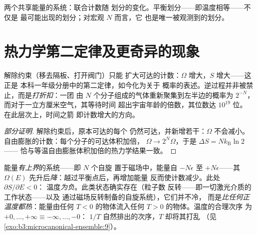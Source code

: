 \begin{omfigure}

{\small 两个共享能量的系统：联合计数随
划分的变化。平衡划分——即温度相等——不仅是
最可能出现的划分；对宏观 $N$ 而言，它
也是唯一被观测到的划分。}
\end{omfigure}

\section{热力学第二定律及更奇异的现象}

\begin{proposition}[不可逆性即计数]\label{prop:b3:microcanonical-ensemble:second-law}
解除约束（移去隔板、打开阀门）只能
扩大可达的计数：$\Omega$ 增大，$S$ 增大——这正是
本科一年级分册中的第二定律，如今化为关于
概率的表述。逆过程并非被禁止，而是\emph{打折扣}：一团
由 $N$ 个分子组成的气体重新聚集到左半边的概率为
$2^{-N}$，而对于一立方厘米空气，其等待时间
超出宇宙年龄的倍数，其位数达 $10^{19}$ 位。
在此层次上，时间之箭
即计数增大的方向。
\end{proposition}

\begin{proof}[部分证明]
解除约束后，原本可达的每个
仍然可达，并新增若干：$\Omega$ 不会减小。
自由膨胀的计数：每个分子的可达体积加倍，
$\Omega \to 2^N\Omega$，于是 $\Delta S = Nk_{\text{B}}\ln2$——
恰与等温自由膨胀体积加倍的热力学结果一致。
\end{proof}

\begin{example}[负温度]\label{ex:b3:microcanonical-ensemble:negative}
能量\emph{有上界}的系统——即 $N$ 个自旋
置于磁场中，能量自 $-N\epsilon$ 至 $+N\epsilon$——其 $\Omega(E)$
先升后\emph{降}：越过平衡点后，再增加能量
反而使计数减少。此处 $\partial S/\partial E < 0$：
温度\emph{为负}。此类状态确实存在（粒子数
反转——即一切激光介质的工作状态——以及
通过磁场反转制备的自旋系统），它们并不冷，
而是\emph{比任何正温度都热}：能量由任何
$T < 0$ 的物体流入任何 $T > 0$ 的物体。温度的合理次序
为 $+0, \dots, +\infty \equiv -\infty, \dots, -0$：
$1/T$ 自然排出的次序，$T$ 却将其打乱
（见\cref{exo:b3:microcanonical-ensemble:9}）。
\end{example}

